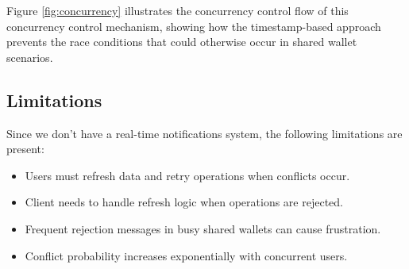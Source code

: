 Figure \ref{fig:concurrency} illustrates the concurrency control flow of this concurrency control mechanism, showing how the timestamp-based approach prevents the race conditions that could otherwise occur in shared wallet scenarios.

\subsection{Limitations}
Since we don't have a real-time notifications system, the following limitations are present:
\begin{itemize}
    \item Users must refresh data and retry operations when conflicts occur.
    \item Client needs to handle refresh logic when operations are rejected.
    \item Frequent rejection messages in busy shared wallets can cause frustration.
    \item Conflict probability increases exponentially with concurrent users.
\end{itemize}
